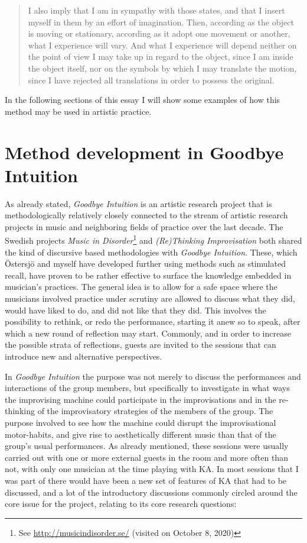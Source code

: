 \documentclass[11pt]{article}
\begin{document}
\begin{quote}
I also imply that I am in sympathy with those states, and that I insert myself in them by an effort of imagination. Then, according as the object is moving or stationary, according as it adopt one movement or another, what I experience will vary. And what I experience will depend neither on the point of view I may take up in regard to the object, since I am inside the object itself, nor on the symbols by which I may translate the motion, since I have rejected all translations in order to possess the original.\citep[p. 2-3]{Bergson1912}
\end{quote}
In the following sections of this essay I will show some examples of how this method may be used in artistic practice.

\section*{Method development in Goodbye Intuition}
\label{sec:org167d210}
As already stated, \emph{Goodbye Intuition} is an artistic research project that is  methodologically relatively closely connected to the stream of artistic research projects in music and neighboring fields of practice over the last decade. The Swedish projects \emph{Music in Disorder}\footnote{See \url{http://musicindisorder.se/} (visited on October 8, 2020)} and \emph{(Re)Thinking Improvisation} \citep{friskostersjo2013} both shared the kind of discursive based methodologies with \emph{Goodbye Intuition}. These, which Östersjö and myself have developed further using methods such as stimulated recall, \citep[See e.g. ][ ]{FriskOstersjo2020} have proven to be rather effective to surface the knowledge embedded in musician's practices. The general idea is to allow for a safe space where the musicians involved practice under scrutiny are allowed to discuss what they did, would have liked to do, and did not like that they did. This involves the possibility to rethink, or redo the performance, starting it anew so to speak, after which a new round of reflection may start. Commonly, and in order to increase the possible strata of reflections, guests are invited to the sessions that can introduce new and alternative perspectives.

In \emph{Goodbye Intuition} the purpose was not merely to discuss the performances and interactions of the group members, but specifically to investigate in what ways the improvising machine could participate in the improvisations and in the re-thinking of the improvisatory strategies of the members of the group. The purpose involved to see how the machine could disrupt the improvisational motor-habits, and give rise to aesthetically different music than that of the group's usual performances. As already mentioned, these sessions were usually carried out with one or more external guests in the room and more often than not, with only one musician at the time playing with KA. In most sessions that I was part of there would have been a new set of features of KA that had to be discussed, and a lot of the introductory discussions commonly circled around the core issue for the project, relating to its core research questions:
\end{document}
